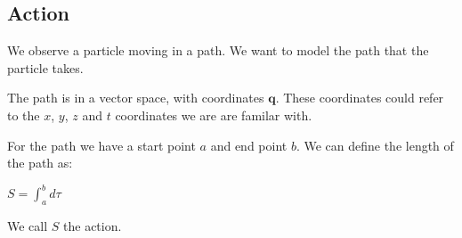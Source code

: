 
\subsection{Action}

We observe a particle moving in a path. We want to model the path that the particle takes.

The path is in a vector space, with coordinates \(\mathbf q\). These coordinates could refer to the \(x\), \(y\), \(z\) and \(t\) coordinates we are are familar with.

For the path we have a start point \(a\) and end point \(b\). We can define the length of the path as:

\(S=\int_a^b d\tau \)

We call \(S\) the action.


